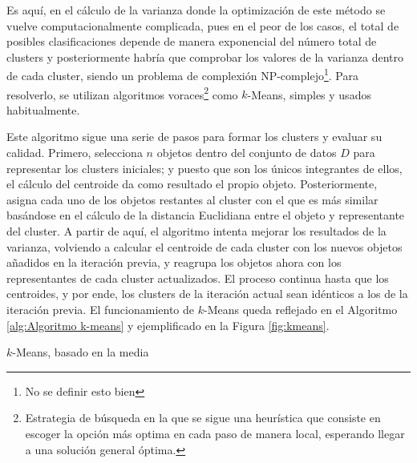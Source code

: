 \documentclass[10pt, a4paper]{article}
\begin{document}
Es aquí, en el cálculo de la varianza donde la optimización de este método se vuelve computacionalmente complicada, pues en el peor de los casos, el total de posibles clasificaciones depende de manera exponencial del número total de clusters y posteriormente habría que comprobar los valores de la varianza dentro de cada cluster, siendo un problema de complexión NP-complejo\footnote{No se definir esto bien}. Para resolverlo, se utilizan algoritmos voraces\footnote{Estrategia de búsqueda en la que se sigue una heurística que consiste en escoger la opción más optima en cada paso de manera local, esperando llegar a una solución general óptima.} como $k$-Means, simples y usados habitualmente.

Este algoritmo sigue una serie de pasos para formar los clusters y evaluar su calidad. Primero, selecciona $n$ objetos dentro del conjunto de datos $D$ para representar los clusters iniciales; y puesto que son los únicos integrantes de ellos, el cálculo del centroide da como resultado el propio objeto. Posteriormente, asigna cada uno de los objetos restantes al cluster con el que es más similar basándose en el cálculo de la distancia Euclidiana entre el objeto y representante del cluster. A partir de aquí, el algoritmo intenta mejorar los resultados de la varianza, volviendo a calcular el centroide de cada cluster con los nuevos objetos añadidos en la iteración previa, y reagrupa los objetos ahora con los representantes de cada cluster actualizados. El proceso continua hasta que los centroides, y por ende, los clusters de la iteración actual sean idénticos a los de la iteración previa. El funcionamiento de $k$-Means queda reflejado en el Algoritmo \ref{alg:Algoritmo k-means} y ejemplificado en la Figura \ref{fig:kmeans}.

\begin{algorithm}[ht]
\SetAlgoLined
  \LinesNumbered
  \DontPrintSemicolon
  \caption{$k$-Means, basado en la media}
  \label{alg:Algoritmo k-means}
\end{algorithm}
\end{document}
